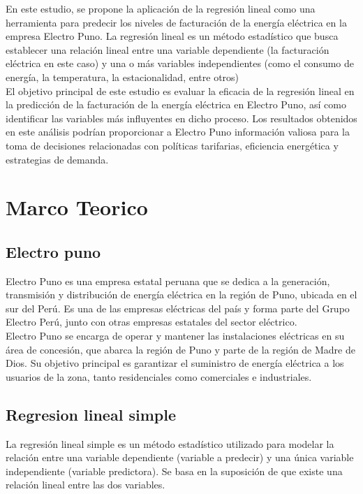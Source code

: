 \documentclass{article}
\begin{document}
En este estudio, se propone la aplicación de la regresión lineal como una herramienta para predecir los niveles de facturación de la energía eléctrica en la empresa Electro Puno. La regresión lineal es un método estadístico que busca establecer una relación lineal entre una variable dependiente (la facturación eléctrica en este caso) y una o más variables independientes (como el consumo de energía, la temperatura, la estacionalidad, entre otros)
\\

El objetivo principal de este estudio es evaluar la eficacia de la regresión lineal en la predicción de la facturación de la energía eléctrica en Electro Puno, así como identificar las variables más influyentes en dicho proceso. Los resultados obtenidos en este análisis podrían proporcionar a Electro Puno información valiosa para la toma de decisiones relacionadas con políticas tarifarias, eficiencia energética y estrategias de demanda.
\section{Marco Teorico}
\subsection{Electro puno}
Electro Puno es una empresa estatal peruana que se dedica a la generación, transmisión y distribución de energía eléctrica en la región de Puno, ubicada en el sur del Perú. Es una de las empresas eléctricas del país y forma parte del Grupo Electro Perú, junto con otras empresas estatales del sector eléctrico.
\\

Electro Puno se encarga de operar y mantener las instalaciones eléctricas en su área de concesión, que abarca la región de Puno y parte de la región de Madre de Dios. Su objetivo principal es garantizar el suministro de energía eléctrica a los usuarios de la zona, tanto residenciales como comerciales e industriales.

\subsection{Regresion lineal simple}
La regresión lineal simple es un método estadístico utilizado para modelar la relación entre una variable dependiente (variable a predecir) y una única variable independiente (variable predictora). Se basa en la suposición de que existe una relación lineal entre las dos variables.
\\
\end{document}

